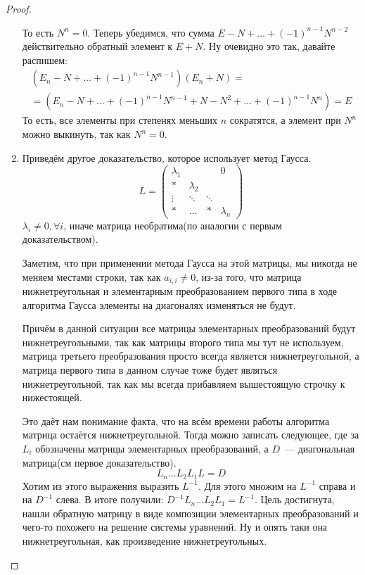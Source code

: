 \begin{proof}
\begin{enumerate}
            То есть $N^n = 0$.  Теперь убедимся, что сумма  $E - N + \dots + (-1)^{n-1}N^{n-2}$ действительно обратный элемент
            к  $E + N$. Ну очевидно это так, давайте распишем:
            \[
                \begin{gathered}
                    \left(E_n - N + \dots + (-1)^{n-1}N^{n-1}\right)(E_n + N)=\\=
                    \left(E_n - N + \dots + (-1)^{n-1}N^{n-1} + N - N^2 + \dots + (-1)^{n-1}N^n\right)= E
                \end{gathered}
            \]
            То есть, все элементы при степенях меньших $n$ сократятся, а элемент при $N^n$ можно 
            выкинуть, так как $N^n = 0$.
        \item
            Приведём другое доказательство, которое использует метод Гаусса.\\
             \[
            L = 
            \begin{pmatrix}
                \lambda_1&&&0\\
                *&\lambda_2&&\\
                \vdots&\ddots&\ddots&\\
                *&\dots&*&\lambda_n
            \end{pmatrix}
             \] 
             $\lambda_i \not= 0,\forall i$, иначе матрица необратима(по аналогии с первым доказательством).

             Заметим, что при применении метода Гаусса на этой матрицы, мы никогда не
             меняем местами строки, так как $a_{i,i} \not= 0$, из-за того, что матрица
             нижнетреугольная и элементарным преобразованием первого типа в ходе алгоритма
             Гаусса элементы на диагоналях изменяться не будут.

             Причём в данной ситуации все матрицы элементарных преобразований будут нижнетреугольными, 
             так как матрицы второго типа мы тут не используем, матрица третьего преобразования просто всегда
             является нижнетреугольной, а матрица первого типа в данном случае тоже будет являться нижнетреугольной,
             так как мы всегда прибавляем вышестоящую строчку к нижестоящей.

             Это даёт нам понимание факта, что на всём времени работы алгоритма матрица остаётся нижнетреугольной.
             Тогда можно записать следующее, где за $L_i$ обозначены матрицы элементарных преобразований, а 
             $D$~--- диагональная матрица(см первое доказательство).
             \[
                 L_n\ldots L_2L_1L=D
             \]
             Хотим из этого выражения выразить $L^{-1}$. Для этого множим на $L^{-1}$ справа
             и на $D^{-1}$ слева. В итоге получили: $D^{-1}L_n\ldots L_2L_1 = L^{-1}$.
             Цель достигнута, нашли обратную матрицу в виде композиции элементарных преобразований и чего-то похожего на решение
             системы уравнений. Ну и опять таки она нижнетреугольная, как произведение нижнетреугольных.
    \end{enumerate}
\end{proof}
